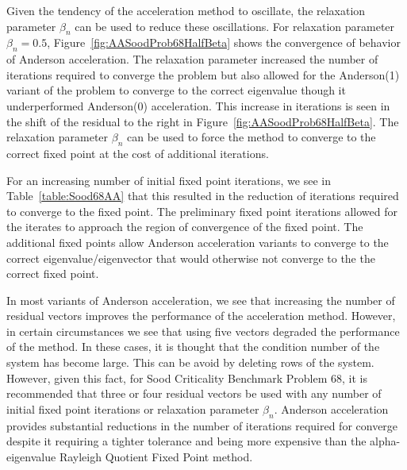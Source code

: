 Given the tendency of the acceleration method to oscillate, the relaxation parameter $\beta_{n}$ can be used to reduce these oscillations. For relaxation parameter $\beta_{n} = 0.5$, Figure~\ref{fig:AASoodProb68HalfBeta} shows the convergence of behavior of Anderson acceleration. The relaxation parameter increased the number of iterations required to converge the problem but also allowed for the Anderson(1) variant of the problem to converge to the correct eigenvalue though it underperformed Anderson(0) acceleration. This increase in iterations is seen in the shift of the residual to the right in Figure~\ref{fig:AASoodProb68HalfBeta}. The relaxation parameter $\beta_{n}$ can be used to force the method to converge to the correct fixed point at the cost of additional iterations.

For an increasing number of initial fixed point iterations, we see in Table~\ref{table:Sood68AA} that this resulted in the reduction of iterations required to converge to the fixed point. The preliminary fixed point iterations allowed for the iterates to approach the region of convergence of the fixed point. The additional fixed points allow Anderson acceleration variants to converge to the correct eigenvalue/eigenvector that would otherwise not converge to the the correct fixed point.

In most variants of Anderson acceleration, we see that increasing the number of residual vectors improves the performance of the acceleration method. However, in certain circumstances we see that using five vectors degraded the performance of the method. In these cases, it is thought that the condition number of the system has become large. This can be avoid by deleting rows of the system. However, given this fact, for Sood Criticality Benchmark Problem 68, it is recommended that three or four residual vectors be used with any number of initial fixed point iterations or relaxation parameter $\beta_{n}$. Anderson acceleration provides substantial reductions in the number of iterations required for converge despite it requiring a tighter tolerance and being more expensive than the alpha-eigenvalue Rayleigh Quotient Fixed Point method.

